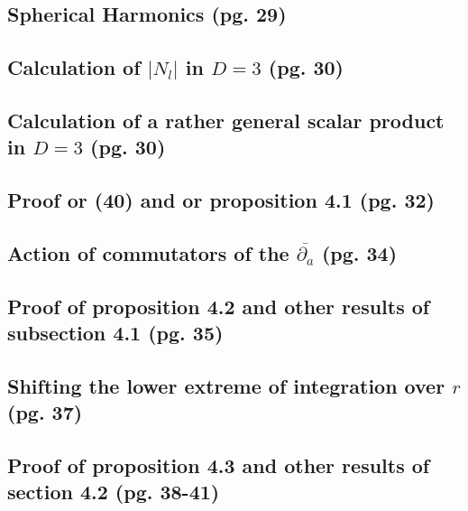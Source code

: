 \documentclass{article}
\begin{document}
\subsection{Spherical Harmonics (pg. 29)}

\subsection{Calculation of $|N_l|$ in $D = 3$ (pg. 30)}

\subsection{Calculation of a rather general scalar product in $D = 3$ (pg. 30)}

\subsection{Proof or (40) and or proposition 4.1 (pg. 32)}

\subsection{Action of commutators of the $\overline{\partial_a}$ (pg. 34)}

\subsection{Proof of proposition 4.2 and other results of subsection 4.1 (pg. 35)}

\subsection{Shifting the lower extreme of integration over $r$ (pg. 37)}

\subsection{Proof of proposition 4.3 and other results of section 4.2 (pg. 38-41)}
\end{document}
